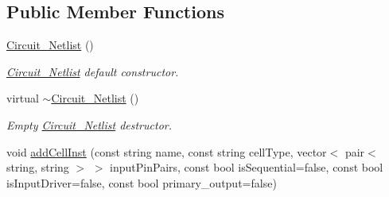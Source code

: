 \subsection*{Public Member Functions}
\begin{DoxyCompactItemize}
\item 
\hyperlink{classCircuit__Netlist_aae9b9e9ea0db3af35377d67a6e4d3d98}{Circuit\-\_\-\-Netlist} ()
\begin{DoxyCompactList}\small\item\em \hyperlink{classCircuit__Netlist}{Circuit\-\_\-\-Netlist} default constructor. \end{DoxyCompactList}\item 
virtual \hyperlink{classCircuit__Netlist_a976bdf13baf79ba608b0c2eff6682efc}{$\sim$\-Circuit\-\_\-\-Netlist} ()
\begin{DoxyCompactList}\small\item\em Empty \hyperlink{classCircuit__Netlist}{Circuit\-\_\-\-Netlist} destructor. \end{DoxyCompactList}\item 
void \hyperlink{classCircuit__Netlist_a325723d10f874b1f37fae290929bb05e}{add\-Cell\-Inst} (const string name, const string cell\-Type, vector$<$ pair$<$ string, string $>$ $>$ input\-Pin\-Pairs, const bool is\-Sequential=false, const bool is\-Input\-Driver=false, const bool primary\-\_\-output=false)
\begin{DoxyCompactList}\small\item\em 


\end{DoxyCompactList}
\end{DoxyCompactItemize}
